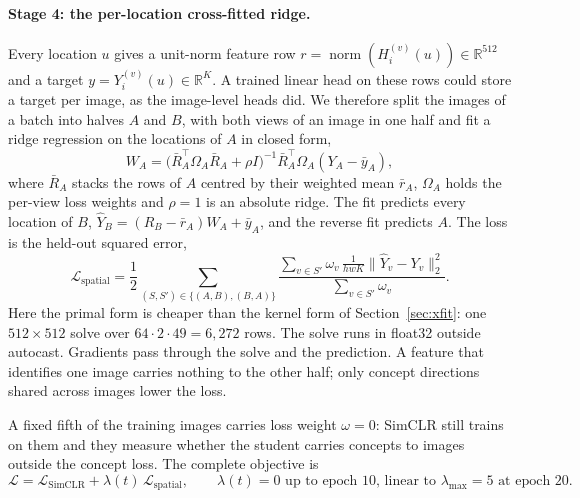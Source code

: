 \documentclass[11pt]{article}
\begin{document}
\paragraph{Stage 4: the per-location cross-fitted ridge.} Every location $u$ gives a unit-norm feature row
$r=\operatorname{norm}(H_i^{(v)}(u))\in\mathbb R^{512}$ and a target $y=Y_i^{(v)}(u)\in\mathbb R^K$. A trained linear
head on these rows could store a target per image, as the image-level heads did. We therefore split the images of a
batch into halves $A$ and $B$, with both views of an image in one half and fit a ridge regression on the locations of
$A$ in closed form,
\begin{equation}
W_A=\big(\bar R_A^\top\Omega_A\bar R_A+\rho I\big)^{-1}\bar R_A^\top\Omega_A(Y_A-\bar y_A),
\end{equation}
where $\bar R_A$ stacks the rows of $A$ centred by their weighted mean $\bar r_A$, $\Omega_A$ holds the per-view loss
weights and $\rho=1$ is an absolute ridge. The fit predicts every location of $B$, $\hat Y_B=(R_B-\bar r_A)W_A+\bar y_A$,
and the reverse fit predicts $A$. The loss is the held-out squared error,
\begin{equation}
\mathcal{L}_{\mathrm{spatial}}=\frac{1}{2}\sum_{(S,S')\in\{(A,B),(B,A)\}}
\frac{\sum_{v\in S'}\omega_v\,\frac{1}{hwK}\big\lVert\hat Y_v-Y_v\big\rVert_2^2}{\sum_{v\in S'}\omega_v}.
\end{equation}
Here the primal form is cheaper than the kernel form of Section~\ref{sec:xfit}: one $512\times512$ solve over
$64\cdot2\cdot49=6{,}272$ rows. The solve runs in float32 outside autocast. Gradients pass through the solve and the
prediction. A feature that identifies one image carries nothing to the other half; only concept directions shared
across images lower the loss.

A fixed fifth of the training images carries loss weight $\omega=0$: SimCLR still trains on them and they measure
whether the student carries concepts to images outside the concept loss. The complete objective is
\begin{equation}
\mathcal L=\mathcal L_{\text{SimCLR}}+\lambda(t)\,\mathcal L_{\text{spatial}},\qquad \lambda(t)=0 \text{ up to epoch 10, linear to } \lambda_{\max}=5 \text{ at epoch 20.}
\end{equation}
\end{document}
